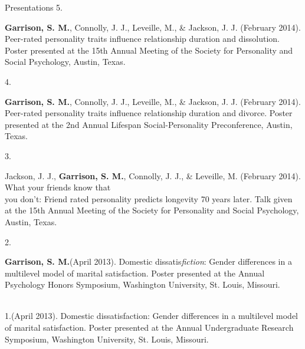 \documentclass {resume}
\newcommand{\meb}{{\bf Garrison, S. M.}\xspace}
\begin{document}
\begin{rSection}{\textrm{Presentations}}
5.\hspace* {2.5 mm}\begin{samepage}\meb, Connolly, J. J., Leveille, M., \& Jackson, J. J. (February 2014). Peer-rated personality traits \hspace* {6 mm}influence relationship duration and dissolution. Poster presented at the 15th Annual Meeting of the Society for \hspace* {6 mm}Personality and Social Psychology, Austin, Texas.\smallskip\\\end{samepage}
4.\hspace* {2.5 mm}\begin{samepage}\meb, Connolly, J. J., Leveille, M., \& Jackson, J. J. (February 2014). Peer-rated personality traits \hspace* {6 mm}influence relationship duration and divorce. Poster presented at the 2nd Annual Lifespan Social-Personality  \hspace* {6 mm}Preconference, Austin, Texas.\smallskip\\\end{samepage}
3.\hspace* {2.5 mm}\begin{samepage}Jackson, J. J., \textbf{Garrison, S. M.}, Connolly, J. J., \& Leveille, M. (February 2014). What your friends know that\\ 
\hspace* {6 mm}you don't: Friend rated personality predicts longevity 70 years later. Talk given at the 15th Annual Meeting \hspace* {6 mm}of the Society for Personality and  Social Psychology, Austin, Texas. \smallskip\\\end{samepage}
2.\hspace* {2.5 mm}\begin{samepage}\meb (April 2013). Domestic dissatis{\em fiction}: Gender differences in a multilevel model of marital \hspace* {6 mm}satisfaction. Poster presented at the Annual Psychology Honors Symposium, Washington  University, St. Louis, \hspace* {6 mm}Missouri.\end{samepage}\smallskip\\
1.\hspace* {2.5 mm}\meb (April 2013). Domestic dissatisfaction: Gender differences in a multilevel model of marital \hspace* {6 mm}satisfaction. Poster presented at the Annual Undergraduate Research Symposium, Washington University, St. \hspace* {6 mm}Louis, Missouri.
\end{rSection}
\end{document}
